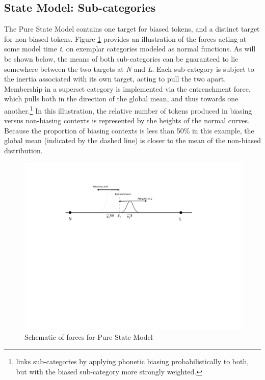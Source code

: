 \subsection{\label{subsec:Lengthening-as-State}State Model: Sub-categories}

The Pure State Model contains one target for biased tokens, and a
distinct target for non-biased tokens. Figure \ref{fig:Model G} provides
an illustration of the forces acting at some model time \emph{t},
on exemplar categories modeled as normal functions. As will be shown
below, the means of both sub-categories can be guaranteed to lie somewhere
between the two targets at \emph{N} and \emph{L}. Each sub-category
is subject to the inertia associated with its own target, acting to
pull the two apart. Membership in a superset category is implemented
via the entrenchment force, which pulls both in the direction of the
global mean, and thus towards one another.\footnote{\citet{soskuthy2013phonetic} links sub-categories by applying phonetic
biasing probabilistically to both, but with the biased sub-category
more strongly weighted. } In this illustration, the relative number of tokens produced in
biasing versus non-biasing contexts is represented by the heights
of the normal curves. Because the proportion of biasing contexts is
less than 50\% in this example, the global mean (indicated by the
dashed line) is closer to the mean of the non-biased distribution. 

\begin{figure}[H]
\begin{centering}
\includegraphics[width=.75\textwidth]{figures/Model6Behavior.pdf}\caption{\label{fig:Model G}Schematic of forces for Pure State Model}
\par\end{centering}
\end{figure}

